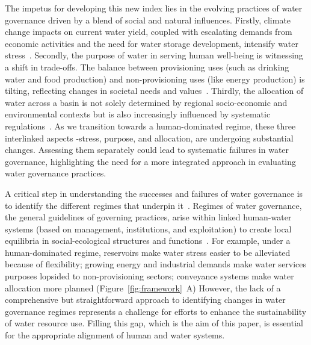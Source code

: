 \documentclass[draft]{../agujournal2019}
\begin{document}
The impetus for developing this new index lies in the evolving practices of water governance driven by a blend of social and natural influences.
Firstly, climate change impacts on current water yield, coupled with escalating demands from economic activities and the need for water storage development, intensify water stress~\cite{qin2019,wada2014,huang2021}.
Secondly, the purpose of water in serving human well-being is witnessing a shift in trade-offs. The balance between provisioning uses (such as drinking water and food production) and non-provisioning uses (like energy production) is tilting, reflecting changes in societal needs and values~\cite{liu2017,florke2018,jaeger2019}.
Thirdly, the allocation of water across a basin is not solely determined by regional socio-economic and environmental contexts but is also increasingly influenced by systematic regulations~\cite{schmandt2021,speed2013}.
As we transition towards a human-dominated regime, these three interlinked aspects -stress, purpose, and allocation, are undergoing substantial changes.
Assessing them separately could lead to systematic failures in water governance, highlighting the need for a more integrated approach in evaluating water governance practices.

A critical step in understanding the successes and failures of water governance is to identify the different regimes that underpin it~\cite{kjellen2015, grafton2013}.
Regimes of water governance, the general guidelines of governing practices, arise within linked human-water systems (based on management, institutions, and exploitation) to create local equilibria in social-ecological structures and functions~\cite{falkenmark2021,bressers2013,loch2020,pahl-wostl2007}.
For example, under a human-dominated regime, reservoirs make water stress easier to be alleviated because of flexibility; growing energy and industrial demands make water services purposes lopsided to non-provisioning sectors; conveyance systems make water allocation more planned (Figure~\ref{fig:framework}~A)
However, the lack of a comprehensive but straightforward approach to identifying changes in water governance regimes represents a challenge for efforts to enhance the sustainability of water resource use.
Filling this gap, which is the aim of this paper, is essential for the appropriate alignment of human and water systems.
\end{document}
